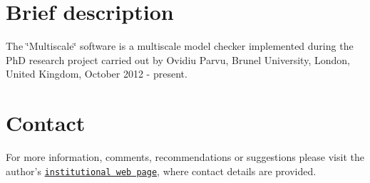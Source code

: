 \hypertarget{index_sec_brief_description}{}\section{\-Brief description}\label{index_sec_brief_description}
\-The \char`\"{}\-Multiscale\char`\"{} software is a multiscale model checker implemented during the \-Ph\-D research project carried out by \-Ovidiu \-Parvu, \-Brunel \-University, \-London, \-United \-Kingdom, \-October 2012 -\/ present.\hypertarget{index_sec_contact}{}\section{\-Contact}\label{index_sec_contact}
\-For more information, comments, recommendations or suggestions please visit the author's \href{http://people.brunel.ac.uk/~cspgoop}{\tt institutional web page}, where contact details are provided. 